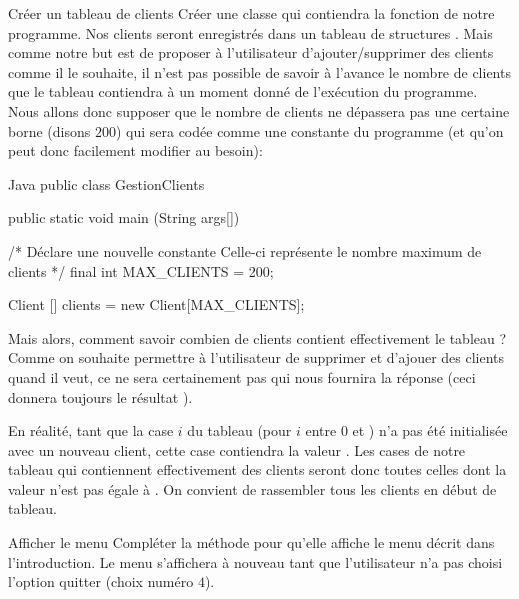 \documentclass[a4paper,11pt]{article}
\begin{document}
 
 	\begin{Exercice}{Cr\'eer un tableau de clients}
	Cr\'eer une classe  qui contiendra la fonction  de notre programme. Nos clients seront enregistr\'es dans un tableau de structures . Mais comme notre but est de proposer \`a l'utilisateur d'ajouter/supprimer des clients comme il le souhaite, il n'est pas possible de savoir \`a l'avance le nombre de clients que le tableau contiendra \`a un moment donn\'e de l'ex\'ecution du programme. Nous allons donc supposer que le nombre de clients ne dépassera pas une certaine borne (disons $200$) qui sera cod\'ee comme une constante du programme (et qu'on peut donc facilement modifier au besoin):
	
		\begin{Code}{Java} 
			public class GestionClients
			{	
				public static void main (String args[])
				{
				        /* Déclare une nouvelle constante
				          Celle-ci représente le nombre maximum de clients */
				        final int MAX_CLIENTS = 200;
				        				
				        Client [] clients = new Client[MAX_CLIENTS];
				}
			}
		\end{Code}
Mais alors, comment savoir combien de clients contient effectivement le tableau ? Comme on souhaite permettre \`a l'utilisateur de supprimer et d'ajouer des clients quand il veut, ce ne sera certainement pas  qui nous fournira la réponse (ceci donnera toujours le r\'esultat ).

En réalité, tant que la case $i$ du tableau (pour $i$ entre $0$ et ) n'a pas été initialisée avec un nouveau client, cette case contiendra la valeur . Les cases de notre tableau qui contiennent effectivement des clients seront donc toutes celles dont la valeur n'est pas égale à . On convient de rassembler tous les clients en d\'ebut de tableau.
\end{Exercice}	

 \begin{Exercice}{Afficher le menu}
 	    Compl\'eter la m\'ethode  pour qu'elle affiche le menu d\'ecrit dans l'introduction. Le menu s'affichera \`a nouveau tant que l'utilisateur n'a pas choisi l'option quitter (choix num\'ero $4$).			
		
  \end{Exercice}
  
\end{document}
